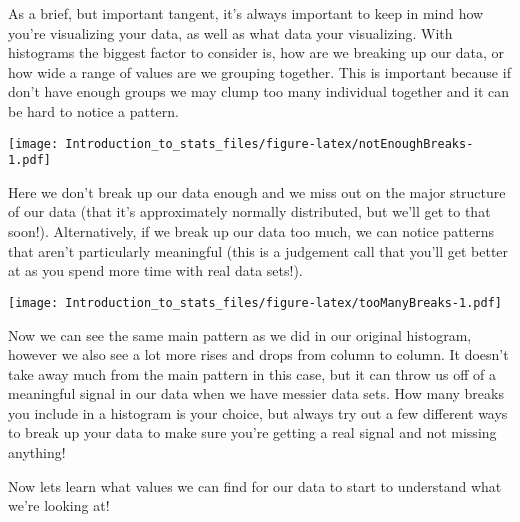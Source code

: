 \documentclass[
]{article}
\newenvironment{Shaded}{\begin{snugshade}}{\end{snugshade}}
\newcommand{\CommentTok}[1]{\textcolor[rgb]{0.56,0.35,0.01}{\textit{#1}}}
\newcommand{\DataTypeTok}[1]{\textcolor[rgb]{0.13,0.29,0.53}{#1}}
\newcommand{\DecValTok}[1]{\textcolor[rgb]{0.00,0.00,0.81}{#1}}
\newcommand{\KeywordTok}[1]{\textcolor[rgb]{0.13,0.29,0.53}{\textbf{#1}}}
\newcommand{\NormalTok}[1]{#1}
\newcommand{\OperatorTok}[1]{\textcolor[rgb]{0.81,0.36,0.00}{\textbf{#1}}}
\begin{document}
As a brief, but important tangent, it's always important to keep in mind
how you're visualizing your data, as well as what data your visualizing.
With histograms the biggest factor to consider is, how are we breaking
up our data, or how wide a range of values are we grouping together.
This is important because if don't have enough groups we may clump too
many individual together and it can be hard to notice a pattern.

\begin{Shaded}
\end{Shaded}

\texttt{[image: Introduction\_to\_stats\_files/figure-latex/notEnoughBreaks-1.pdf]}

Here we don't break up our data enough and we miss out on the major
structure of our data (that it's approximately normally distributed, but
we'll get to that soon!). Alternatively, if we break up our data too
much, we can notice patterns that aren't particularly meaningful (this
is a judgement call that you'll get better at as you spend more time
with real data sets!).

\begin{Shaded}
\end{Shaded}

\texttt{[image: Introduction\_to\_stats\_files/figure-latex/tooManyBreaks-1.pdf]}

Now we can see the same main pattern as we did in our original
histogram, however we also see a lot more rises and drops from column to
column. It doesn't take away much from the main pattern in this case,
but it can throw us off of a meaningful signal in our data when we have
messier data sets. How many breaks you include in a histogram is your
choice, but always try out a few different ways to break up your data to
make sure you're getting a real signal and not missing anything!

Now lets learn what values we can find for our data to start to
understand what we're looking at!
\end{document}

